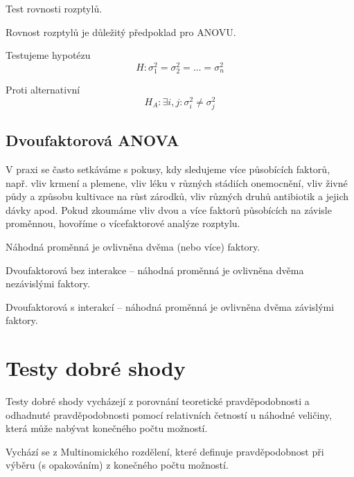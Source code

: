 \begin{compactitem}
    \item Test rovnosti rozptylů.

    \item Rovnost rozptylů je důležitý předpoklad pro ANOVU.

    \item Testujeme hypotézu
    $$ H : \sigma^2_1 = \sigma^2_2 = \ldots = \sigma^2_n $$

    \item Proti alternativní
    $$ H_A : \exists i, j : \sigma^2_i \not= \sigma^2_j $$

\end{compactitem}

\subsection{Dvoufaktorová ANOVA}

\begin{compactitem}
    \item V praxi se často setkáváme s pokusy, kdy sledujeme více působících faktorů, např. vliv krmení a plemene, vliv léku v různých stádiích onemocnění, vliv živné půdy a způsobu kultivace na růst zárodků, vliv různých druhů antibiotik a jejich dávky apod. Pokud zkoumáme vliv dvou a více faktorů působících na závisle proměnnou, hovoříme o vícefaktorové analýze rozptylu.

    \item Náhodná proměnná je ovlivněna dvěma (nebo více) faktory.

    \item Dvoufaktorová bez interakce -- náhodná proměnná je ovlivněna dvěma nezávislými faktory.

    \item Dvoufaktorová s interakcí -- náhodná proměnná je ovlivněna dvěma závislými faktory.
\end{compactitem}


\section{Testy dobré shody}

\begin{compactitem}
    \item Testy dobré shody vycházejí z porovnání teoretické pravděpodobnosti a odhadnuté pravděpodobnosti pomocí relativních četností u náhodné veličiny, která může nabývat
    konečného počtu možností.

    \item Vychází se z Multinomického rozdělení, které definuje pravděpodobnost při výběru (s opakováním) z konečného počtu možností.
\end{compactitem}

